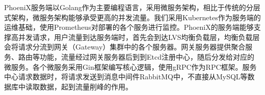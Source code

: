 PhoeniX服务端以Golang作为主要编程语言，采用微服务架构，相比于传统的分层式架构，微服务架构能够承受更高的并发流量。我们采用Kubernetes作为服务端的运维基础，使用Prometheus对部署的各个服务进行监控。PhoeniX的服务端能够支撑高并发请求，用户流量到达服务端时，首先会到达LVS均衡负载层，均衡负载层会将请求分流到网关（Gateway）集群中的各个服务器。网关服务器提供聚合服务、路由等功能，流量经过网关服务器后到到Etcd注册中心，随后分发给对应的微服务。各个微服务采用Gin框架编写核心逻辑，使用gRPC作为RPC框架。服务中心请求数据时，将请求发送到消息中间件RabbitMQ中，不直接从MySQL等数据库中读取数据，起到流量削峰的作用。